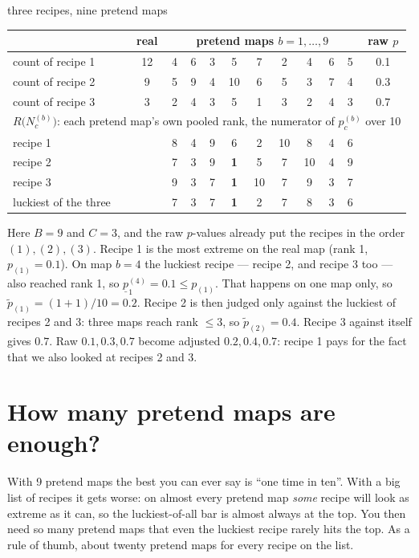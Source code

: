 \documentclass[11pt,a4paper]{article}
\theoremstyle{remark}
\newcommand{\minp}{\underline{p}}
\begin{document}
\begin{example}{three recipes, nine pretend maps}
\small
\begin{center}
\begin{tabular}{lccccccccccc}
\toprule
& real & \multicolumn{9}{c}{pretend maps $b=1,\dots,9$} & raw $p$ \\
\midrule
count of recipe 1 & 12 & 4 & 6 & 3 & 5 & 7 & 2 & 4 & 6 & 5 & 0.1 \\
count of recipe 2 &  9 & 5 & 9 & 4 & 10 & 6 & 5 & 3 & 7 & 4 & 0.3 \\
count of recipe 3 &  3 & 2 & 4 & 3 & 5 & 1 & 3 & 2 & 4 & 3 & 0.7 \\
\midrule
\multicolumn{12}{l}{$R\bigl(N^{(b)}_c\bigr)$: each pretend map's own pooled rank, the numerator of $p^{(b)}_c$ over 10} \\
recipe 1 & & 8 & 4 & 9 & 6 & 2 & 10 & 8 & 4 & 6 & \\
recipe 2 & & 7 & 3 & 9 & \textbf{1} & 5 & 7 & 10 & 4 & 9 & \\
recipe 3 & & 9 & 3 & 7 & \textbf{1} & 10 & 7 & 9 & 3 & 7 & \\
\midrule
luckiest of the three & & 7 & 3 & 7 & \textbf{1} & 2 & 7 & 8 & 3 & 6 & \\
\bottomrule
\end{tabular}
\end{center}
\normalsize
Here $B=9$ and $C=3$, and the raw $p$-values already put the recipes in the
order $(1),(2),(3)$. Recipe 1 is the most extreme on the real map (rank 1,
$p_{(1)}=0.1$). On map $b=4$ the luckiest recipe --- recipe 2, and recipe 3
too --- also reached rank 1, so $\minp^{(4)}_1=0.1\le p_{(1)}$. That happens on
one map only, so $\tilde p_{(1)}=(1+1)/10=0.2$. Recipe 2 is then judged only
against the luckiest of recipes 2 and 3: three maps reach rank $\le3$, so
$\tilde p_{(2)}=0.4$. Recipe 3 against itself gives $0.7$. Raw
$0.1,0.3,0.7$ become adjusted $0.2,0.4,0.7$: recipe 1 pays for the fact that we
also looked at recipes 2 and 3.
\end{example}

\section{How many pretend maps are enough?}
\label{sec:budget}

\begin{plain}
With 9 pretend maps the best you can ever say is ``one time in ten''. With a
big list of recipes it gets worse: on almost every pretend map \emph{some}
recipe will look as extreme as it can, so the luckiest-of-all bar is almost
always at the top. You then need so many pretend maps that even the luckiest
recipe rarely hits the top. As a rule of thumb, about twenty pretend maps for
every recipe on the list.
\end{plain}
\end{document}
